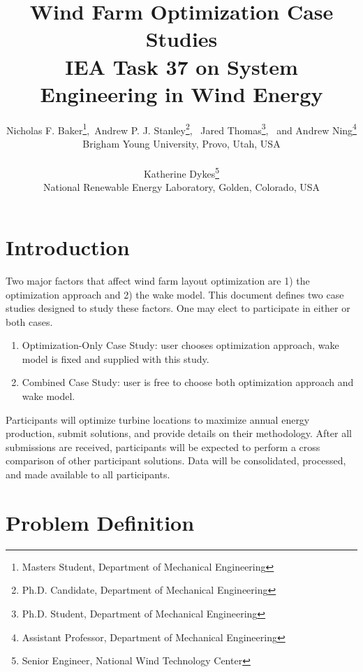 \documentclass{article}
\begin{document}
\title{Wind Farm Optimization Case Studies
\\
\small{IEA Task 37 on System Engineering in Wind Energy}
}
\author{\small Nicholas F. Baker\thanks{Masters Student, Department of Mechanical Engineering},\  Andrew P. J. Stanley\thanks{Ph.D. Candidate, Department of Mechanical Engineering}, \ Jared Thomas\thanks{Ph.D. Student, Department of Mechanical Engineering}, \ and Andrew Ning\thanks{Assistant Professor, Department of Mechanical Engineering} \\
    {\small Brigham Young University, Provo, Utah, USA}\\
\vspace{-1em}\\
\small Katherine Dykes\thanks{Senior Engineer, National Wind Technology Center}\\
    \small National Renewable Energy Laboratory, Golden, Colorado, USA}
\maketitle

\section{Introduction}

Two major factors that affect wind farm layout optimization are 1) the optimization approach and 2) the wake model. This document defines two case studies designed to study these factors. One may elect to participate in either or both cases.
\begin{enumerate}
\item Optimization-Only Case Study: user chooses optimization approach, wake model is fixed and supplied with this study.
\item Combined Case Study: user is free to choose both optimization approach and wake model.
\end{enumerate}

Participants will optimize turbine locations to maximize annual energy production, submit solutions, and provide details on their methodology.  After all submissions are received, participants will be expected to perform a cross comparison of other participant solutions.  Data will be consolidated, processed, and made available to all participants.

\section{Problem Definition}
\end{document}
